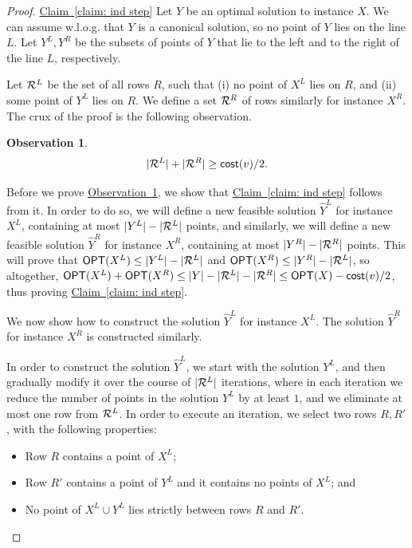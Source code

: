 \documentclass[11pt]{article}
\numberwithin{equation}{section}
\theoremstyle{definition}
\theoremstyle{plain}
\newcommand{\expref}[2]{\hyperref[#2]{#1~\ref{#2}}}
\newtheorem{myobs}[theorem]{Observation}
\begin{document}
\begin{proof}{\expref{Claim}{claim: ind step}}
	Let $Y$ be an optimal solution to instance $X$. We can assume w.l.o.g. that $Y$ is a canonical solution, so no point of $Y$ lies on the line $L$. Let $Y^L,Y^R$ be the subsets of points of $Y$ that lie to the left and to the right of the line $L$, respectively.
	
Let ${\mathcal R}^L$ be the set of all rows $R$, such that (i) no point of $X^L$ lies on $R$, and (ii) some point of $Y^L$ lies on $R$. We define a set ${\mathcal R}^R$ of rows similarly for instance $X^R$. The crux of the proof is the following observation.

\begin{myobs}\label{obs number of inactive rows with points}
\[	|{\mathcal R}^L|+|{\mathcal R}^R|\geq \mathsf{cost}(v)/2.\]
\end{myobs}

Before we	prove \expref{Observation}{obs number of inactive rows with points}, we show that \expref{Claim}{claim: ind step} follows from it. In order to do so, we will define a new feasible solution $\hat Y^L$ for instance $X^L$, containing at most $|Y^L|-|{\mathcal R}^L|$ points, and similarly, we will define a new feasible solution $\hat Y^R$ for instance $X^R$, containing at most $|Y^R|-|{\mathcal R}^R|$ points. This will prove that $\mbox{\sf OPT}(X^L)\leq |Y^L|-|{\mathcal R}^L|$ and $\mbox{\sf OPT}(X^R)\leq |Y^R|-|{\mathcal R}^L|$, so altogether, $\mbox{\sf OPT}(X^L)+\mbox{\sf OPT}(X^R) \leq |Y|-|{\mathcal R}^L|-|{\mathcal R}^R|\leq \mbox{\sf OPT}(X)-\mathsf{cost}(v)/2$, thus proving \expref{Claim}{claim: ind step}.

We now show how to construct the solution $\hat Y^L$ for instance $X^L$. The solution $\hat Y^R$ for instance $X^R$ is constructed similarly.

In order to construct the solution $\hat Y^L$, we start with the solution $Y^L$, and then gradually modify it over the course of $|{\mathcal R}^L|$ iterations, where in each iteration we reduce the number of points in the solution $Y^L$ by at least $1$, and we eliminate at most one row from ${\mathcal R}^L$. In order to execute an iteration, we select two rows $R,R'$, with the following properties:

\begin{itemize}
	\item Row $R$ contains a point of $X^L$;
	\item Row $R'$ contains a point of $Y^L$ and it contains no points of $X^L$; and
	\item No point of $X^L\cup Y^L$ lies strictly between  rows $R$ and $R'$.
\end{itemize}


\end{proof}
\end{document}
